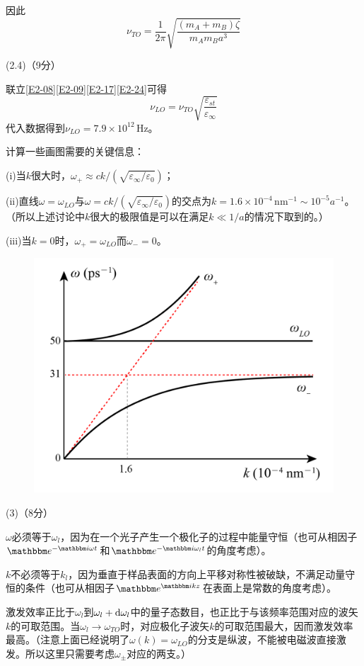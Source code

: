 \documentclass[10pt,a4paper,onecolumn,UTF8]{ctexart}
\begin{document}
	因此
	\begin{equation}\label{E2-24}
		\nu_{TO}=\frac 1 {2\pi}\sqrt{\frac{(m_A+m_B)\zeta }{m_Am_Ba^3}}
	\end{equation}
	
	(2.4)（9分）
	
	联立\eqref{E2-08}\eqref{E2-09}\eqref{E2-17}\eqref{E2-24}可得
	\begin{equation}
		\nu_{LO}=\nu_{TO}\sqrt{\frac{\varepsilon_{st}}{\varepsilon_{\infty}}}
	\end{equation}
	代入数据得到$\nu_{LO}=7.9\times10^{12}\,\text{Hz}$。
	
	计算一些画图需要的关键信息：
	
	(i)当$k$很大时，$\omega_+\approx ck/(\sqrt{\varepsilon_{\infty}/\varepsilon_0})$；
	
	(ii)直线$\omega=\omega_{LO}$与$\omega= ck/(\sqrt{\varepsilon_{\infty}/\varepsilon_0})$的交点为$k=1.6\times10^{-4}\,\text{nm}^{-1}\sim10^{-5}a^{-1}$。（所以上述讨论中$k$很大的极限值是可以在满足$k\ll1/a$的情况下取到的。）
	
	(iii)当$k=0$时，$\omega_+=\omega_{LO}$而$\omega_-=0$。
	
	\begin{figure}[!bh]
		\centering
		\includegraphics[width=0.6\columnwidth]{FA.png}
	\end{figure}
	
	(3)（8分）
	
	$\omega$必须等于$\omega_l$，因为在一个光子产生一个极化子的过程中能量守恒（也可从相因子$\ue^{-\ui\omega t}$和$\ue^{-\ui\omega_l t}$的角度考虑）。
	
	$k$不必须等于$k_l$，因为垂直于样品表面的方向上平移对称性被破缺，不满足动量守恒的条件（也可从相因子$\ue^{\ui k z}$在表面上是常数的角度考虑）。
	
	激发效率正比于$\omega_l$到$\omega_l+\mathrm{d}\omega_l$中的量子态数目，也正比于与该频率范围对应的波矢$k$的可取范围。当$\omega_l\to\omega_{TO}$时，对应极化子波矢$k$的可取范围最大，因而激发效率最高。（注意上面已经说明了$\omega(k)=\omega_{LO}$的分支是纵波，不能被电磁波直接激发。所以这里只需要考虑$\omega_{\pm}$对应的两支。）\\
	
\end{document}
